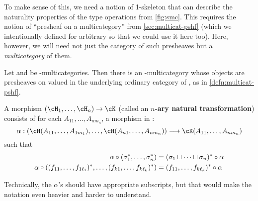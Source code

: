 To make sense of this, we need a notion of 1-skeleton that can describe the naturality properties of the type operations from \cref{fig:smc}.
This requires the notion of ``presheaf on a multicategory'' from \cref{sec:multicat-pshf} (which we intentionally defined for arbitrary \fS so that we could use it here too).
Here, however, we will need not just the category of such presheaves but a \emph{multicategory} of them.

\begin{thm}\label{thm:multicat-day}
  Let \cM and \cC be \fS-multicategories.
  Then there is an \fS-multicategory whose objects are presheaves on \cM valued in the underlying ordinary category of \cC, as in \cref{defn:multicat-pshf}.

  A morphism $(\cH_1,\dots,\cH_n)\to\cK$ (called an \textbf{$n$-ary natural transformation}) consists of
  for each $A_{11},\dots,A_{n m_n}$, a morphism in \cC:
  \[ \alpha : (\cH(A_{11},\dots,A_{1 m_1}),\dots,\cH(A_{n1},\dots,A_{n m_n})) \too \cK(A_{11},\dots,A_{n m_n}) \]
  such that
  \begin{align*}
    \alpha\circ (\sigma_1^*,\dots,\sigma_n^*) &= (\sigma_1\sqcup\cdots\sqcup\sigma_n)^*\circ\alpha\\
    \alpha\circ ((f_{11},\dots,f_{1 \ell_1})^*,\dots,(f_{k1},\dots,f_{k \ell_k})^*)
    &= (f_{11},\dots,f_{k \ell_k})^*\circ\alpha
    \thmqedhere
  \end{align*}
\end{thm}
Technically, the $\alpha$'s should have appropriate subscripts, but that would make the notation even heavier and harder to understand.

